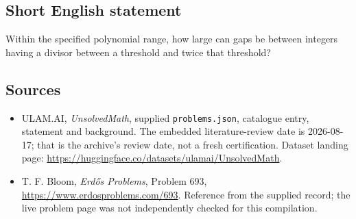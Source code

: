 \documentclass[11pt,a4paper]{article}
\begin{document}
\subsection{Short English statement}

Within the specified polynomial range, how large can gaps be between integers having a divisor between a threshold and twice that threshold?

\subsection{Sources}

{\small

\begin{itemize}

\item[\hypertarget{source:statement:1}{S1}] ULAM.AI, \emph{UnsolvedMath}, supplied \texttt{problems.json}, catalogue entry, statement and background. The embedded literature-review date is 2026-08-17; that is the archive’s review date, not a fresh certification. Dataset landing page: \url{https://huggingface.co/datasets/ulamai/UnsolvedMath}.

\item[\hypertarget{source:statement:2}{S2}] T. F. Bloom, \emph{Erdős Problems}, Problem 693, \url{https://www.erdosproblems.com/693}. Reference from the supplied record; the live problem page was not independently checked for this compilation.

\end{itemize}

}

\label{end:statement}
\end{document}
